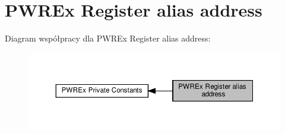 \hypertarget{group___p_w_r_ex__register__alias__address}{}\section{P\+W\+R\+Ex Register alias address}
\label{group___p_w_r_ex__register__alias__address}
Diagram współpracy dla P\+W\+R\+Ex Register alias address\+:\nopagebreak
\begin{figure}[H]
\begin{center}
\leavevmode
\includegraphics[width=350pt]{group___p_w_r_ex__register__alias__address}
\end{center}
\end{figure}
